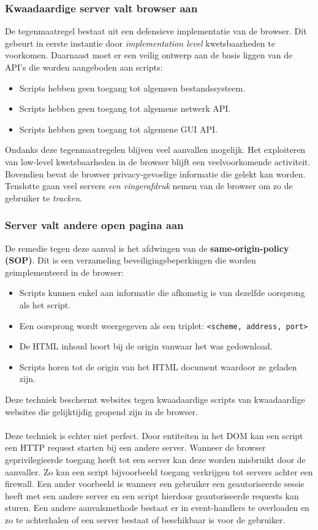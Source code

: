 \documentclass[../main.tex]{subfiles}
\begin{document}
\subsubsection{Kwaadaardige server valt browser aan}
De tegenmaatregel bestaat uit een defensieve implementatie van de browser. Dit gebeurt in eerste instantie door \textit{implementation level} kwetsbaarheden te voorkomen. Daarnaast moet er een veilig ontwerp aan de basis liggen van de API's die worden aangeboden aan scripts:
\begin{itemize}
	\item Scripts hebben geen toegang tot algemeen bestandssysteem.
	\item Scripts hebben geen toegang tot algemene netwerk API.
	\item Scripts hebben geen toegang tot algemene GUI API.
\end{itemize}
Ondanks deze tegenmaatregelen blijven veel aanvallen mogelijk. Het exploiteren van low-level kwetsbaarheden in de browser blijft een veelvoorkomende activiteit. Bovendien bevat de browser privacy-gevoelige informatie die gelekt kan worden. Tenslotte gaan veel servers \textit{een vingerafdruk} nemen van de browser om zo de gebruiker te \textit{tracken}.

\subsubsection{Server valt andere open pagina aan}
De remedie tegen deze aanval is het afdwingen van de \textbf{same-origin-policy (SOP)}. Dit is een verzameling beveiligingsbeperkingen die worden geimplementeerd in de browser:
\begin{itemize}
	\item Scripts kunnen enkel aan informatie die afkomstig is van dezelfde oorsprong als het script. 
	\item Een oorsprong wordt weergegeven als een triplet:  \texttt{<scheme, address, port>}
	\item De HTML inhoud hoort bij de origin vanwaar het was gedownload.
	\item Scripts horen tot de origin van het HTML document waardoor ze geladen zijn.
\end{itemize} 
Deze techniek beschermt websites tegen kwaadaardige scripts van kwaadaardige websites die gelijktijdig geopend zijn in de browser. 
\\\\
Deze techniek is echter niet perfect. Door entiteiten in het DOM kan een script een HTTP request starten bij een andere server. Wanneer de browser geprivilegieerde toegang heeft tot een server kan deze worden misbruikt door de aanvaller. Zo kan een script bijvoorbeeld toegang verkrijgen tot servers achter een firewall. Een ander voorbeeld is wanneer een gebruiker een geautoriseerde sessie heeft met een andere server en een script hierdoor geautoriseerde requests kan sturen. Een andere aanvalsmethode bestaat er in event-handlers te overloaden en zo te achterhalen of een server bestaat of beschikbaar is voor de gebruiker.
\end{document}
